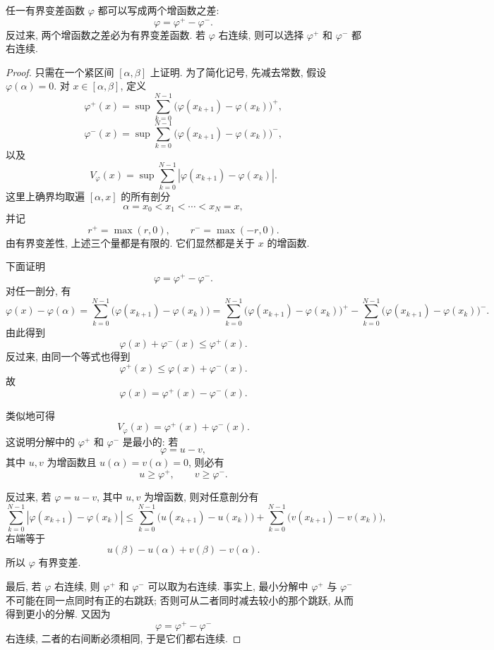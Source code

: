 \begin{thm}\label{thm:bv-decomposition-difference-increasing}
	任一有界变差函数 \(\varphi\) 都可以写成两个增函数之差:
	\[
	\varphi=\varphi^+-\varphi^-.
	\]
	反过来, 两个增函数之差必为有界变差函数. 若 \(\varphi\) 右连续, 则可以选择 \(\varphi^+\) 和 \(\varphi^-\) 都右连续.
\end{thm}

\begin{proof}
	只需在一个紧区间 \([\alpha,\beta]\) 上证明. 为了简化记号, 先减去常数, 假设 \(\varphi(\alpha)=0\). 对 \(x\in[\alpha,\beta]\), 定义
	\[
	\varphi^+(x)=
	\sup\sum_{k=0}^{N-1}\bigl(\varphi(x_{k+1})-\varphi(x_k)\bigr)^+,
	\]
	\[
	\varphi^-(x)=
	\sup\sum_{k=0}^{N-1}\bigl(\varphi(x_{k+1})-\varphi(x_k)\bigr)^-,
	\]
	以及
	\[
	V_\varphi(x)=
	\sup\sum_{k=0}^{N-1}\left|\varphi(x_{k+1})-\varphi(x_k)\right|.
	\]
	这里上确界均取遍 \([\alpha,x]\) 的所有剖分
	\[
	\alpha=x_0<x_1<\cdots<x_N=x,
	\]
	并记
	\[
	r^+=\max(r,0),
	\qquad
	r^- =\max(-r,0).
	\]
	由有界变差性, 上述三个量都是有限的. 它们显然都是关于 \(x\) 的增函数.
	
	下面证明
	\[
	\varphi=\varphi^+-\varphi^-.
	\]
	对任一剖分, 有
	\[
	\varphi(x)-\varphi(\alpha)
	=
	\sum_{k=0}^{N-1}\bigl(\varphi(x_{k+1})-\varphi(x_k)\bigr)
	=
	\sum_{k=0}^{N-1}\bigl(\varphi(x_{k+1})-\varphi(x_k)\bigr)^+
	-
	\sum_{k=0}^{N-1}\bigl(\varphi(x_{k+1})-\varphi(x_k)\bigr)^-.
	\]
	由此得到
	\[
	\varphi(x)+\varphi^-(x)\leq \varphi^+(x).
	\]
	反过来, 由同一个等式也得到
	\[
	\varphi^+(x)\leq \varphi(x)+\varphi^-(x).
	\]
	故
	\[
	\varphi(x)=\varphi^+(x)-\varphi^-(x).
	\]
	
	类似地可得
	\[
	V_\varphi(x)=\varphi^+(x)+\varphi^-(x).
	\]
	这说明分解中的 \(\varphi^+\) 和 \(\varphi^-\) 是最小的: 若
	\[
	\varphi=u-v,
	\]
	其中 \(u,v\) 为增函数且 \(u(\alpha)=v(\alpha)=0\), 则必有
	\[
	u\geq \varphi^+,
	\qquad
	v\geq \varphi^-.
	\]
	
	反过来, 若 \(\varphi=u-v\), 其中 \(u,v\) 为增函数, 则对任意剖分有
	\[
	\sum_{k=0}^{N-1}|\varphi(x_{k+1})-\varphi(x_k)|
	\leq
	\sum_{k=0}^{N-1}\bigl(u(x_{k+1})-u(x_k)\bigr)
	+
	\sum_{k=0}^{N-1}\bigl(v(x_{k+1})-v(x_k)\bigr),
	\]
	右端等于
	\[
	u(\beta)-u(\alpha)+v(\beta)-v(\alpha).
	\]
	所以 \(\varphi\) 有界变差.
	
	最后, 若 \(\varphi\) 右连续, 则 \(\varphi^+\) 和 \(\varphi^-\) 可以取为右连续. 事实上, 最小分解中 \(\varphi^+\) 与 \(\varphi^-\) 不可能在同一点同时有正的右跳跃; 否则可从二者同时减去较小的那个跳跃, 从而得到更小的分解. 又因为
	\[
	\varphi=\varphi^+-\varphi^-
	\]
	右连续, 二者的右间断必须相同, 于是它们都右连续.
\end{proof}

